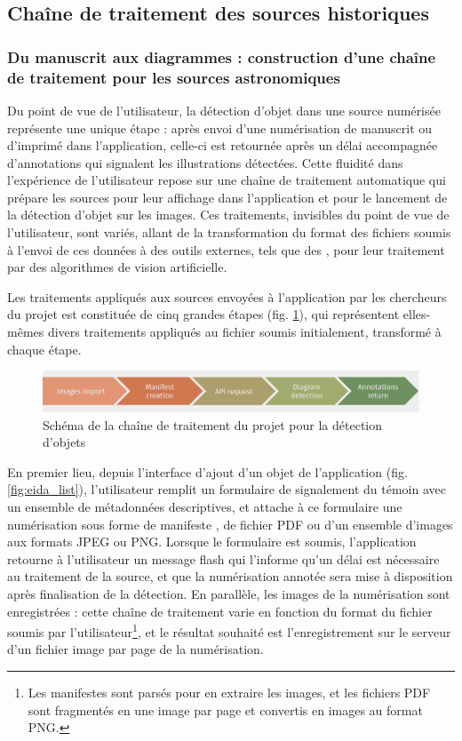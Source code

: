
\subsection{Chaîne de traitement des sources historiques}
    \subsubsection{Du manuscrit aux diagrammes : construction d'une chaîne de traitement pour les sources astronomiques}
	Du point de vue de l'utilisateur, la détection d'objet dans une source numérisée représente une unique étape : après envoi d'une numérisation de manuscrit ou d'imprimé dans l'application, celle-ci est retournée après un délai accompagnée d'annotations qui signalent les illustrations détectées. Cette fluidité dans l'expérience de l'utilisateur repose sur une chaîne de traitement automatique qui prépare les sources pour leur affichage dans l'application et pour le lancement de la détection d'objet sur les images. Ces traitements, invisibles du point de vue de l'utilisateur, sont variés, allant de la transformation du format des fichiers soumis à l'envoi de ces données à des outils externes, tels que des \api, pour leur traitement par des algorithmes de vision artificielle.
	
	Les traitements appliqués aux sources envoyées à l'application par les chercheurs du projet \eida est constituée de cinq grandes étapes (fig. \ref{fig:detection_workflow}), qui représentent elles-mêmes divers traitements appliqués au fichier soumis initialement, transformé à chaque étape. 
	
	\begin{figure}[h]
		\centering
		\includegraphics[width=16cm]{images/detection_workflow.png}
		\caption{Schéma de la chaîne de traitement du projet \eida pour la détection d'objets}
		\label{fig:detection_workflow}
	\end{figure}

	En premier lieu, depuis l'interface d'ajout d'un objet de l'application \eida (fig. \ref{fig:eida_list}), l'utilisateur remplit un formulaire de signalement du témoin avec un ensemble de métadonnées descriptives, et attache à ce formulaire une numérisation sous forme de manifeste \iiif, de fichier PDF ou d'un ensemble d'images aux formats JPEG ou PNG. Lorsque le formulaire est soumis, l'application retourne à l'utilisateur un message flash qui l'informe qu'un délai est nécessaire au traitement de la source, et que la numérisation annotée sera mise à disposition après finalisation de la détection. En parallèle, les images de la numérisation sont enregistrées : cette chaîne de traitement varie en fonction du format du fichier soumis par l'utilisateur\footnote{Les manifestes \iiif sont parsés pour en extraire les images, et les fichiers PDF sont fragmentés en une image par page et convertis en images au format PNG.}, et le résultat souhaité est l'enregistrement sur le serveur d'un fichier image par page de la numérisation.
	
